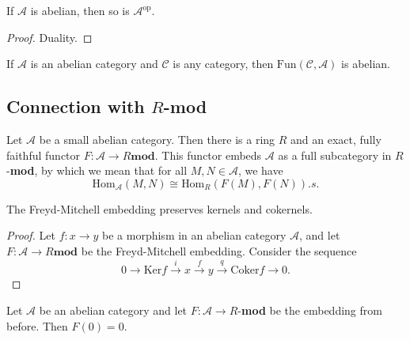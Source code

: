 \begin{lemma}
  If $ \mathcal{A} $ is abelian, then so is $ \mathcal{A}^{\text{op}} $.
\end{lemma}

\begin{proof}
  Duality.
\end{proof}

\begin{lemma}
  If $ \mathcal{A} $ is an abelian category and $ \mathcal{C} $ is any category, then $ \text{Fun}(\mathcal{C}, \mathcal{A}) $ is abelian.
\end{lemma}

\subsection{Connection with $ R $-mod} %
\label{sub:connection_with_r_}

\begin{theorem}
  Let $ \mathcal{A} $ be a small abelian category. Then there is a ring $ R $ and an exact, fully faithful functor $ F:\mathcal{A} \to R\mathbf{mod} $. This functor embeds $ \mathcal{A} $ as a full subcategory in $ R $-\textbf{mod}, by which we mean that for all $ M,N \in \mathcal{A} $, we have
  \begin{equation*}
    \text{Hom}_{\mathcal{A}}(M,N) \cong \text{Hom}_R(F(M),F(N)).s
  .\end{equation*}
\end{theorem}

\begin{lemma}
  The Freyd-Mitchell embedding preserves kernels and cokernels.
\end{lemma}
\begin{proof}
  Let $ f: x \to y $ be a morphism in an abelian category $ \mathcal{A} $, and let $ F: \mathcal{A}\to R\mathbf{mod} $ be the Freyd-Mitchell embedding. Consider the sequence
  \begin{equation*}
    0 \to \text{Ker}f \xrightarrow{i} x \xrightarrow{f} y \xrightarrow{q} \text{Coker}f \to 0
  .\end{equation*}
\end{proof}

\begin{lemma}
  Let $ \mathcal{A} $ be an abelian category and let $ F:\mathcal{A} \to R$-\textbf{mod} be the embedding from before. Then $ F(0)=0 $.
\end{lemma}
